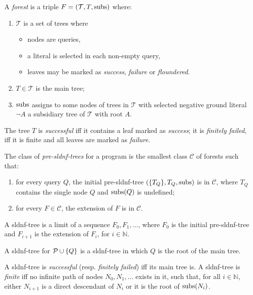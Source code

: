 \begin{dfn}[Forests]
    \label{dfn:forest}
    A \emph{forest} is a triple \(F = (\mathcal{T},T,\operatorname{subs})\) where:
    \begin{enumerate}
        \item \(\mathcal{T}\) is a set of trees where
        \begin{itemize}
            \item nodes are queries,
            \item a literal is selected in each non-empty query,
            \item leaves may be marked as \emph{success}, \emph{failure} or \emph{floundered}.
        \end{itemize}
        \item \(T \in \mathcal{T}\) is the main tree;
        \item \(\operatorname{subs}\) assigns to some nodes of trees in \(\mathcal{T}\) with selected negative ground literal \(\neg A\) a subsidiary tree of \(\mathcal{T}\) with root \(A\).
    \end{enumerate}
    The tree \(T\) is \emph{successful} iff it contains a leaf marked as \emph{success}; it is \emph{finitely failed}, iff it is finite and all leaves are marked as \emph{failure}.
\end{dfn}

\begin{dfn}
    The class of \emph{pre-\gls{sldnf}-trees} for a program \prog is the smallest class \(\mathcal{C}\) of forests such that:
    \begin{enumerate}
        \item for every query \(Q\), the initial pre-\gls{sldnf}-tree \((\lbrace T_Q \rbrace, T_Q, \operatorname{subs})\) is in \(\mathcal{C}\), where \(T_Q\) contains the single node \(Q\) and \(\operatorname{subs}(Q)\) is undefined;
        \item for every \(F \in \mathcal{C}\), the extension of \(F\) is in \(\mathcal{C}\).
    \end{enumerate}
\end{dfn}

\begin{dfn}
    A \gls{sldnf}-tree is a limit of a sequence \(F_0,F_1,\dotsc\), where \(F_0\) is the initial pre-\gls{sldnf}-tree and \(F_{i+1}\) is the extension of \(F_i\), for \(i \in \mathbb{N}\).

    A \gls{sldnf}-tree for \(\mathcal{P} \cup \lbrace Q \rbrace\) is a \gls{sldnf}-tree in which \(Q\) is the root of the main tree.

    A \gls{sldnf}-tree is \emph{successful} (resp. \emph{finitely failed}) iff its main tree is.
    A \gls{sldnf}-tree is \emph{finite} iff no infinite path of nodes \(N_0,N_1,\dotsc\) exists in it, such that, for all \(i \in \mathbb{N}\), either \(N_{i+1}\) is a direct descendant of \(N_i\) or it is the root of \(\operatorname{subs}(N_i)\).
\end{dfn}

